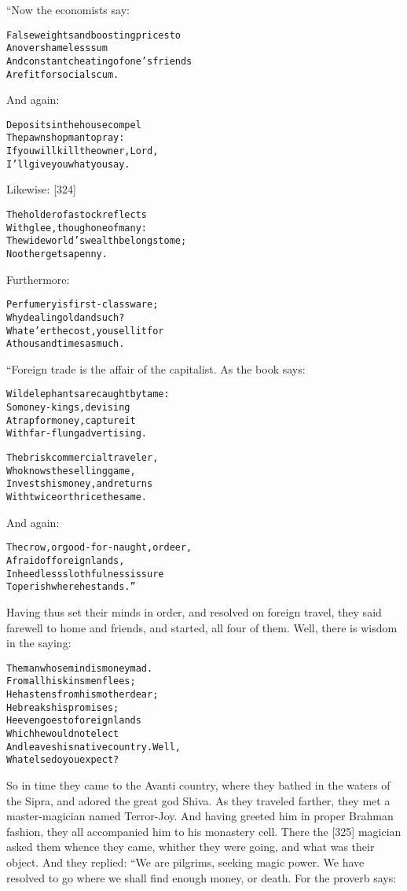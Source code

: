 \documentclass{article}
\renewenvironment{verbatim}{\begin{alltt}\normalfont\begin{centering}}{\end{centering}\end{alltt}}
\begin{document}
“Now the economists say:

\begin{verbatim}
False weights and boosting prices to
    An overshameless sum
And constant cheating of one's friends
    Are fit for social scum.
\end{verbatim}
And again:

\begin{verbatim}
Deposits in the house compel
    The pawnshop man to pray:
If you will kill the owner, Lord,
    I'll give you what you say.
\end{verbatim}
Likewise: [324]

\begin{verbatim}
The holder of a stock reflects
    With glee, though one of many:
The wide world's wealth belongs to me;
    No other gets a penny.
\end{verbatim}
Furthermore:

\begin{verbatim}
Perfumery is first-class ware;
    Why deal in gold and such?
Whate'er the cost, you sell it for
    A thousand times as much.
\end{verbatim}
“Foreign trade is the affair of the capitalist. As the book says:

\begin{verbatim}
Wild elephants are caught by tame:
    So money-kings, devising
A trap for money, capture it
    With far-flung advertising.

The brisk commercial traveler,
    Who knows the selling game,
Invests his money, and returns
    With twice or thrice the same.
\end{verbatim}
And again:

\begin{verbatim}
The crow, or good-for-naught, or deer,
    Afraid of foreign lands,
In heedless slothfulness is sure
    To perish where he stands.”
\end{verbatim}
Having thus set their minds in order, and resolved on foreign
travel, they said farewell to home and friends, and started, all
four of them. Well, there is wisdom in the saying:

\begin{verbatim}
The man whose mind is money mad.
    From all his kinsmen flees;
He hastens from his mother dear;
    He breaks his promises;
He even goes to foreign lands
    Which he would not elect
And leaves his native country. Well,
    What else do you expect?
\end{verbatim}
So in time they came to the Avanti country, where they bathed in
the waters of the Sipra, and adored the great god Shiva. As they
traveled farther, they met a master-magician named Terror-Joy. And
having greeted him in proper Brahman fashion, they all accompanied
him to his monastery cell. There the [325] magician asked them
whence they came, whither they were going, and what was their
object. And they replied: “We are pilgrims, seeking magic power. We
have resolved to go where we shall find enough money, or death. For
the proverb says:
\end{document}
